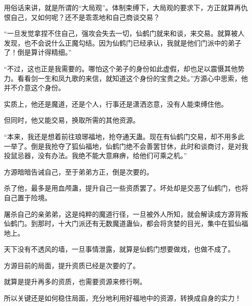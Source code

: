 \begin{this_body}
用俗话来讲，就是所谓的“大局观”。体制束缚下，大局观的要求下，方正就算再仇恨自己，又如何呢？还不是乖乖地和自己商谈交易？

“一旦发觉拿捏不住自己，强攻会失去一切，仙鹤门就来和谈，来交易。就算被人发现，也不会说什么正魔勾结。因为仙鹤门已经承认，我就是他们门派中的弟子了！倒是算计得精细。”

“不过，这也正是我需要的。哪怕这个弟子的身份如此虚假，却也足以震慑其他势力。看看剑一生和凤九歌的来信，就知道这个身份的宝贵之处。”方源心中思索，他并不介意这个身份。

实质上，他还是魔道，还是个人，行事还是潇洒恣意，没有人能束缚住他。

但同时，他又能交易，换取所需的其他资源。

“本来，我还是想着前往琅琊福地，抢夺通天蛊。现在有仙鹤门交易，却不用多此一举了。倒是我抢夺了狐仙福地，仙鹤门绝不会善罢甘休，此时和谈商讨，是对我投鼠忌器，没有办法。我绝不能大意麻痹，给他们可乘之机。”

方源暗暗告诫自己，至于弟弟方正，倒是次要的。

杀了他，最多是用血颅蛊，提升自己一些资质罢了。坏处却是交恶了仙鹤门，也将自己置于险境。

屠杀自己的亲弟弟，这是纯粹的魔道行径，一旦被外人所知，就会解读成方源背叛仙鹤门。到那时，十大门派还有无数魔道蛊仙，都会将贪婪的目光，集中在狐仙福地上。

天下没有不透风的墙，一旦事情泄露，就算是仙鹤门想要做戏，也做不成了。

方源目前的局面，提升资质已经是次要的了。

就算是提升再多的资质，也需要资源来修行啊。

所以关键还是如何稳住局面，充分地利用好福地中的资源，转换成自身的实力！

\end{this_body}

